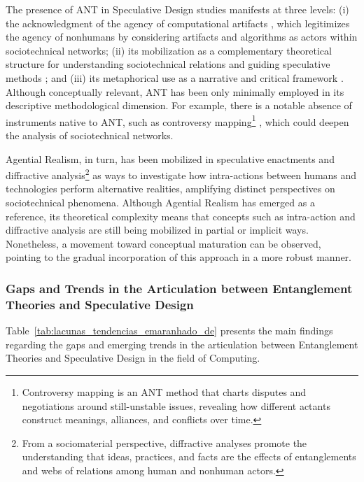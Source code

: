 The presence of ANT in Speculative Design studies manifests at three levels: (i) the acknowledgment of the agency of computational artifacts \cite{bekker2023challenges}, which legitimizes the agency of nonhumans by considering artifacts and algorithms as actors within sociotechnical networks; (ii) its mobilization as a complementary theoretical structure for understanding sociotechnical relations and guiding speculative methods \cite{busboom2023futures}; and (iii) its metaphorical use as a narrative and critical framework \cite{encinas2020metaprobes, coulton2024designing}. Although conceptually relevant, ANT has been only minimally employed in its descriptive methodological dimension. For example, there is a notable absence of instruments native to ANT, such as controversy mapping\footnote{Controversy mapping is an ANT method that charts disputes and negotiations around still-unstable issues, revealing how different actants construct meanings, alliances, and conflicts over time.} \cite{venturini2021controversy}, which could deepen the analysis of sociotechnical networks.

Agential Realism, in turn, has been mobilized in speculative enactments and diffractive analysis\footnote{From a sociomaterial perspective, diffractive analyses promote the understanding that ideas, practices, and facts are the effects of entanglements and webs of relations among human and nonhuman actors.} \cite{barad2007meeting, forlano2023speculative} as ways to investigate how intra-actions between humans and technologies perform alternative realities, amplifying distinct perspectives on sociotechnical phenomena. Although Agential Realism has emerged as a reference, its theoretical complexity means that concepts such as intra-action and diffractive analysis are still being mobilized in partial or implicit ways. Nonetheless, a movement toward conceptual maturation can be observed, pointing to the gradual incorporation of this approach in a more robust manner.


\subsubsection{Gaps and Trends in the Articulation between Entanglement Theories and Speculative Design}

Table~\ref{tab:lacunas_tendencias_emaranhado_de} presents the main findings regarding the gaps and emerging trends in the articulation between Entanglement Theories and Speculative Design in the field of Computing.


